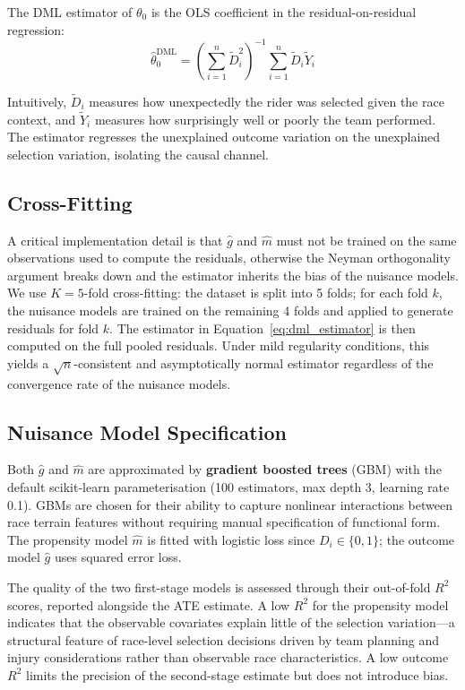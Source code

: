 The DML estimator of $\theta_0$ is the OLS coefficient in the residual-on-residual regression:
\begin{equation}
    \hat{\theta}_0^{\text{DML}} = \left(\sum_{i=1}^n \tilde{D}_i^2\right)^{-1} \sum_{i=1}^n \tilde{D}_i \tilde{Y}_i
    \label{eq:dml_estimator}
\end{equation}

Intuitively, $\tilde{D}_i$ measures how unexpectedly the rider was selected given the race context, and $\tilde{Y}_i$ measures how surprisingly well or poorly the team performed. The estimator regresses the unexplained outcome variation on the unexplained selection variation, isolating the causal channel.

\subsection{Cross-Fitting}

A critical implementation detail is that $\hat{g}$ and $\hat{m}$ must not be trained on the same observations used to compute the residuals, otherwise the Neyman orthogonality argument breaks down and the estimator inherits the bias of the nuisance models. We use $K = 5$-fold cross-fitting: the dataset is split into 5 folds; for each fold $k$, the nuisance models are trained on the remaining 4 folds and applied to generate residuals for fold $k$. The estimator in Equation~\eqref{eq:dml_estimator} is then computed on the full pooled residuals. Under mild regularity conditions, this yields a $\sqrt{n}$-consistent and asymptotically normal estimator regardless of the convergence rate of the nuisance models.

\subsection{Nuisance Model Specification}

Both $\hat{g}$ and $\hat{m}$ are approximated by \textbf{gradient boosted trees} (GBM) with the default scikit-learn parameterisation (100 estimators, max depth 3, learning rate 0.1). GBMs are chosen for their ability to capture nonlinear interactions between race terrain features without requiring manual specification of functional form. The propensity model $\hat{m}$ is fitted with logistic loss since $D_i \in \{0,1\}$; the outcome model $\hat{g}$ uses squared error loss.

The quality of the two first-stage models is assessed through their out-of-fold $R^2$ scores, reported alongside the ATE estimate. A low $R^2$ for the propensity model indicates that the observable covariates explain little of the selection variation---a structural feature of race-level selection decisions driven by team planning and injury considerations rather than observable race characteristics. A low outcome $R^2$ limits the precision of the second-stage estimate but does not introduce bias.

